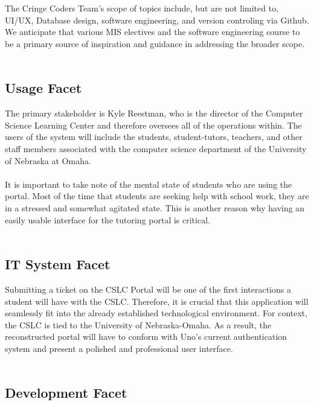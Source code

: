 \documentclass[oneside,openany,obeyspaces]{book}
\newcommand\tab[1][1cm]{\hspace*{#1}}
\newcommand\TeamName{Cringe Coders Team}
\begin{document}
\begin{flushleft}
    \tab The \TeamName's scope of topics include, but are not limited to, UI/UX, Database design, software engineering, and version controling via Github. We anticipate that various MIS electives and the software engineering course to be a primary source of inspiration and guidance in addressing the broader scope.\\~\\

    \subsection{Usage Facet}

    \tab The primary stakeholder is Kyle Reestman, who is the director of the Computer Science Learning Center and therefore oversees all of the operations within. The users of the system will include the students, student-tutors, teachers, and other staff members associated with the computer science department of the University of Nebraska at Omaha.\\~\\

    \tab It is important to take note of the mental state of students who are using the portal. Most of the time that students are seeking help with school work, they are in a stressed and somewhat agitated state. This is another reason why having an easily usable interface for the tutoring portal is critical. \\~\\

    \subsection{IT System Facet}

    \tab Submitting a ticket on the CSLC Portal will be one of the first interactions a student will have with the CSLC. Therefore, it is crucial that this application will seamlessly fit into the already established technological environment. For context, the CSLC is tied to the University of Nebraska-Omaha. As a result, the reconstructed portal will have to conform with Uno’s current authentication system and present a polished and professional user interface.\\~\\

    \subsection{Development Facet}


\end{flushleft}
\end{document}
